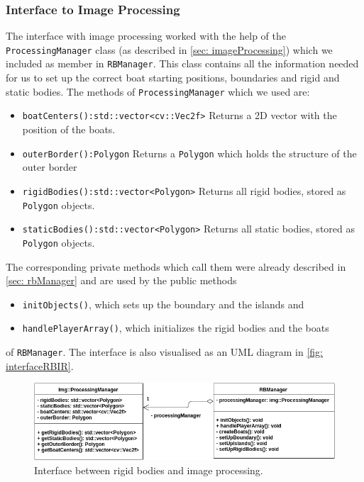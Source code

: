 \subsubsection{Interface to Image Processing}
\label{sec: interfaceImageProcessing}
The interface with image processing worked with the help of the \texttt{ProcessingManager} class (as described in \autoref{sec: imageProcessing}) which we included as member in \texttt{RBManager}. This class contains all the information needed for us to set up the correct boat starting positions, boundaries and rigid and static bodies. The methods of \texttt{ProcessingManager} which we used are:
\begin{itemize}
\item \texttt{boatCenters():std::vector<cv::Vec2f>} Returns a 2D vector with the position of the boats.
\item \texttt{outerBorder():Polygon} Returns a \texttt{Polygon} which holds the structure of the outer border
\item \texttt{rigidBodies():std::vector<Polygon>} Returns all rigid bodies, stored as \texttt{Polygon} objects.
\item \texttt{staticBodies():std::vector<Polygon>} Returns all static bodies, stored as \texttt{Polygon} objects.
\end{itemize} 
The corresponding private methods which call them were already described in \autoref{sec: rbManager} and are used by the public methods
\begin{itemize}
\item \texttt{initObjects()}, which sets up the boundary and the islands and
\item \texttt{handlePlayerArray()}, which initializes the rigid bodies and the boats
\end{itemize}
of \texttt{RBManager}. The interface is also visualised as an UML diagram in \autoref{fig: interfaceRBIR}.
\begin{figure}[ht]
\centering
\includegraphics[scale=0.5]{img/RigidBodies/InterfaceRBImageRecogniton.png}
\caption{Interface between rigid bodies and image processing.}
\label{fig: interfaceRBIR}
\end{figure}


